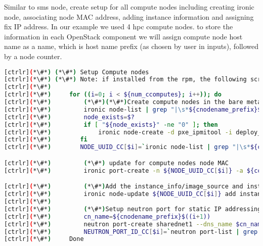 Similar to sms node, create setup for all compute nodes including creating ironic node, associating node MAC address, adding instance information and assigning fix IP address. In our example we used 4 hpc compute nodes. to store the information in each OpenStack component we will assign compute node host name as a name, which is host name prefix (as chosen by user in inputs), followed by a node counter. 

\begin{lstlisting}[language=bash,keywords={}]
[ctrlr](*\#*) (*\#*) Setup Compute nodes
[ctrlr](*\#*) (*\#*) Note: if installed from the rpm, the following script is installed as setup_compute_nodes.sh 
[ctrlr](*\#*) 
[ctrlr](*\#*)     for ((i=0; i < ${num_ccomputes}; i++)); do
[ctrlr](*\#*)         (*\#*)(*\#*)Create compute nodes in the bare metal service
[ctrlr](*\#*)         ironic node-list | grep "|\s*${cnodename_prefix}$((i+1))\s*|"
[ctrlr](*\#*)         node_exists=$?
[ctrlr](*\#*)         if [ "${node_exists}" -ne "0" ]; then
[ctrlr](*\#*)             ironic node-create -d pxe_ipmitool -i deploy_kernel=${DEPLOY_VMLINUZ_UUID} -i deploy_ramdisk=${DEPLOY_INITRD_UUID} -i ipmi_terminal_port=8023 -i ipmi_address=${cc_bmc[$i]} -i ipmi_username=${cc_bmc_username} -i ipmi_password=${cc_bmc_password} -p cpus=${CPU} -p memory_mb=${RAM_MB} -p local_gb=${DISK_GB} -p cpu_arch=${ARCH} -p capabilities="boot_mode:bios" -n ${cnodename_prefix}$((i+1))
[ctrlr](*\#*)        fi
[ctrlr](*\#*)        NODE_UUID_CC[$i]=`ironic node-list | grep "|\s*${cnodename_prefix}$((i+1))\s*|" | awk '{print $2}'`

[ctrlr](*\#*)         (*\#*) update for compute nodes node MAC
[ctrlr](*\#*)         ironic port-create -n ${NODE_UUID_CC[$i]} -a ${cc_mac[$i]}

[ctrlr](*\#*)         (*\#*)Add the instance_info/image_source and instance_info/root_gb
[ctrlr](*\#*)         ironic node-update ${NODE_UUID_CC[$i]} add instance_info/image_source=${USER_DISK_IMAGE_UUID} instance_info/root_gb=50
[ctrlr](*\#*) 
[ctrlr](*\#*)         (*\#*)Setup neutron port for static IP addressing of compute nodes
[ctrlr](*\#*)         cn_name=${cnodename_prefix}$((i+1))
[ctrlr](*\#*)         neutron port-create sharednet1 --dns_name $cn_name --fixed-ip ip_address=${cc_ip[$i]} --name $cn_name --mac-address ${cc_mac[$i]}
[ctrlr](*\#*)         NEUTRON_PORT_ID_CC[$i]=`neutron port-list | grep "|\s*${cnodename_prefix}$((i+1))\s*|" | awk '{print $2}'`
[ctrlr](*\#*)     Done
\end{lstlisting}


